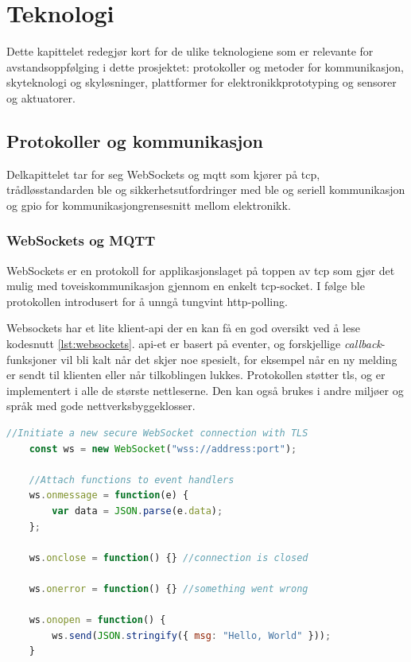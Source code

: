 \chapter{Teknologi}
\label{ch:technology}
Dette kapittelet redegjør kort for de ulike teknologiene som er relevante
for avstandsoppfølging i dette prosjektet: protokoller og metoder
for kommunikasjon, skyteknologi og skyløsninger, plattformer for elektronikkprototyping og sensorer og aktuatorer.

\section{Protokoller og kommunikasjon}
Delkapittelet tar for seg WebSockets og \gls{mqtt} som kjører
på \gls{tcp}, trådløsstandarden \gls{ble} og sikkerhetsutfordringer med \gls{ble} og seriell kommunikasjon og \gls{gpio} for kommunikasjongrensesnitt mellom elektronikk.

\subsection{WebSockets og MQTT}
WebSockets er en protokoll for applikasjonslaget på toppen av \gls{tcp}
som gjør det mulig med toveiskommunikasjon gjennom en enkelt \gls{tcp}-socket.
I følge \citet{rfc6455} ble protokollen introdusert for å unngå tungvint \gls{http}-polling.

Websockets har et lite klient-\gls{api} der en kan få en god oversikt ved å lese
kodesnutt \ref{lst:websockets}. \gls{api}-et er basert på eventer, og forskjellige \textit{callback}-funksjoner
vil bli kalt når det skjer noe spesielt, for eksempel når en ny melding er sendt til klienten eller
når tilkoblingen lukkes. Protokollen støtter \gls{tls}, og er implementert i alle de største nettleserne.
Den kan også brukes i andre miljøer og språk med gode nettverksbyggeklosser.

\begin{minipage}{\linewidth}
\begin{lstlisting}[frame=single, language=JavaScript,
    caption=WebSockets: JavaScript-eksempelkode, label=lst:websockets]
    //Initiate a new secure WebSocket connection with TLS
    const ws = new WebSocket("wss://address:port");

    //Attach functions to event handlers
    ws.onmessage = function(e) {
        var data = JSON.parse(e.data);
    };

    ws.onclose = function() {} //connection is closed

    ws.onerror = function() {} //something went wrong
    
    ws.onopen = function() {
        ws.send(JSON.stringify({ msg: "Hello, World" }));
    }
\end{lstlisting}
\end{minipage}

